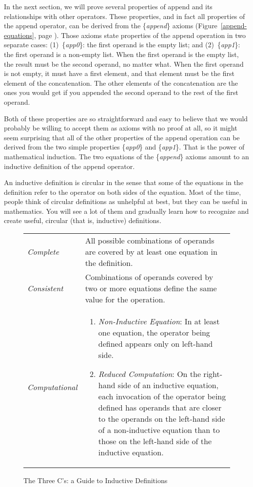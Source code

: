 In the next section, we will prove several properties of \textsf{append}
and its relationships with other operators.
These properties, and in fact all properties of the \textsf{append} operator,
can be derived from the \{\emph{append}\} axioms
(Figure~\ref{append-equations}, page \pageref{append-equations}).
Those axioms state properties of the append operation in two separate cases:
(1)~\{\emph{app0}\}: the first operand is the empty list; and
(2)~\{\emph{app1}\}: the first operand is a non-empty list.
When the first operand is the empty list,
the result must be the second operand, no matter what.
When the first operand is not empty, it must have a first element,
and that element must be the first element of the concatenation.
The other elements of the concatenation are the ones you would get
if you appended the second operand to the rest of the first operand.

Both of these properties are so straightforward and easy to believe
that we would probably be willing to accept them as axioms with no proof at all,
so it might seem surprising that all of the other properties
of the \textsf{append} operation can be derived from
the two simple properties \{\emph{app0}\} and \{\emph{app1}\}.
That is the power of mathematical induction.
The two equations of the \{\emph{append}\} axioms
amount to an inductive definition of the \textsf{append} operator.

An inductive definition is circular in the sense
that some of the equations in the definition refer
to the operator on both sides of the equation.
Most of the time, people think of circular definitions
as unhelpful at best,
but they can be useful in mathematics.
You will see a lot of them and
gradually learn how to recognize and create useful,
circular (that is, inductive) definitions.

\begin{figure}
\begin{center}
\begin{tabular}{lp{3.5in}}
\emph{Complete} & All possible combinations of operands are covered by at least one equation in the definition. \\
\emph{Consistent} & Combinations of operands covered by two or more equations define the same value for the operation. \\
\emph{Computational} &
\begin{enumerate}
\item \emph{Non-Inductive Equation}: In at least one equation,
the operator being defined appears only on left-hand side.
\item \emph{Reduced Computation}:
\index{three C's}\index{definition!inductive (circular)}On the right-hand side of an inductive equation,
each invocation of the operator being defined has operands that
are closer to the operands on the left-hand side of a non-inductive equation
than to those on the left-hand side of the inductive equation.
\end{enumerate}
\end{tabular}
\end{center}
\caption{The Three C's: a Guide to Inductive Definitions}
\label{fig:inductive-def-keys}
\end{figure}

